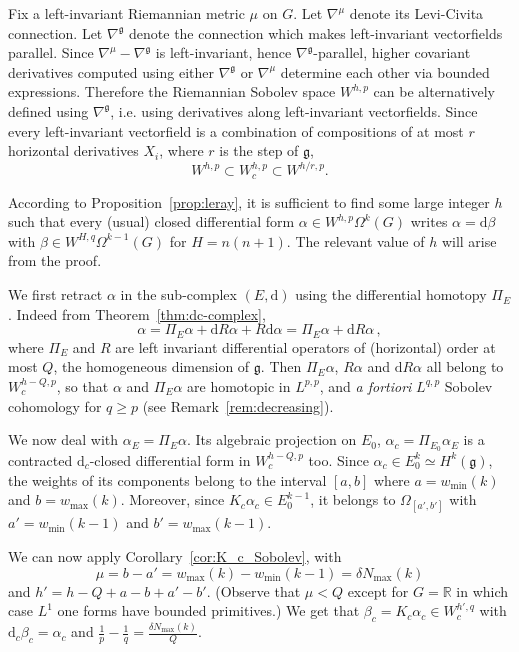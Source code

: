 \documentclass[11pt]{article}
\theoremstyle{definition}
\numberwithin{equation}{section}
\numberwithin{figure}{section}
\numberwithin{table}{section}
\newcommand{\R}{\mathbb{R}}
\newcommand{\dd}{\mathrm{d}}
\newcommand{\dalpha}{\dd \alpha}
\begin{document}
Fix a left-invariant Riemannian metric $\mu$ on $G$. Let $\nabla^\mu$ denote its Levi-Civita connection. Let $\nabla^\mathfrak{g}$ denote the connection which makes left-invariant vectorfields parallel. Since $\nabla^\mu-\nabla^\mathfrak{g}$ is left-invariant, hence $\nabla^\mathfrak{g}$-parallel, higher covariant derivatives computed using either $\nabla^\mathfrak{g}$ or $\nabla^\mu$ determine each other via bounded expressions. Therefore the Riemannian Sobolev space $W^{h,p}$ can be alternatively defined using $\nabla^\mathfrak{g}$, i.e. using derivatives along left-invariant vectorfields. Since every left-invariant vectorfield is a combination of compositions of at most $r$ horizontal derivatives $X_i$, where $r$ is the step of $\mathfrak{g}$,
\begin{equation}\label{eq:14}
W^{h,p}\subset W_c^{h,p}\subset W^{h/r,p}.
\end{equation}

According to Proposition~\ref{prop:leray}, it is sufficient to find some large integer $h$ such that every (usual) closed differential form $\alpha \in W^{h,p}\Omega^k(G)$ writes $\alpha = \dd \beta$ with $\beta \in W^{H,q}\Omega^{k-1}(G)$ for $H=n(n+1)$. The relevant value of $h$ will arise from the proof.

We first retract $\alpha$ in the sub-complex $(E,\dd)$ using the differential homotopy $\Pi_E$. Indeed from Theorem~\ref{thm:dc-complex},
\[
\alpha = \Pi_E \alpha + \dd R\alpha + R \dalpha = \Pi_E \alpha + \dd R
\alpha \,,
\]
where $\Pi_E$ and $R$ are left invariant differential operators of (horizontal) order at most $Q$, the homogeneous dimension of $\mathfrak{g}$. Then $\Pi_E \alpha$, $R\alpha$ and $\dd R \alpha$ all belong to $W^{h-Q,p}_c$, so that $\alpha$ and $\Pi_E \alpha$ are homotopic in $L^{p,p}$, and \emph{a fortiori} $L^{q,p}$ Sobolev cohomology for $q\geq p$ (see Remark~\ref{rem:decreasing}).

We now deal with $\alpha_E= \Pi_E \alpha$. Its algebraic projection on $E_0$, $\alpha_c = \Pi_{E_0} \alpha_E$ is a contracted $\dd_c$-closed differential form in $W_c^{h-Q,p}$ too. Since $\alpha_c \in E_0^k \simeq H^k(\mathfrak{g})$, the weights of its components belong to the interval $[a,b]$ where $a=w_{\min} (k)$ and $b=w_{\max} (k)$. Moreover, since $K_c \alpha_c \in E_0^{k-1}$, it belongs to $\Omega_{[a',b']}$ with $a' = w_{\min}(k-1)$ and $b' = w_{\max}(k-1)$.

We can now apply Corollary~\ref{cor:K_c_Sobolev}, with
\[
\mu = b- a' = w_{\max}(k) - w_{\min}(k-1) = \delta N_{\max}(k)
\]
and $h' = h-Q + a-b + a' -b'$. (Observe that $\mu < Q$ except for $G=\R$ in which case $L^1$ one forms have bounded primitives.) We get that $\beta_c = K_c \alpha_c \in W^{h',q}_c$ with $\dd_c \beta_c = \alpha_c$ and $\frac{1}{p}-\frac{1}{q}=\frac{\delta N_{\max}(k)}{Q}$.
\end{document}
